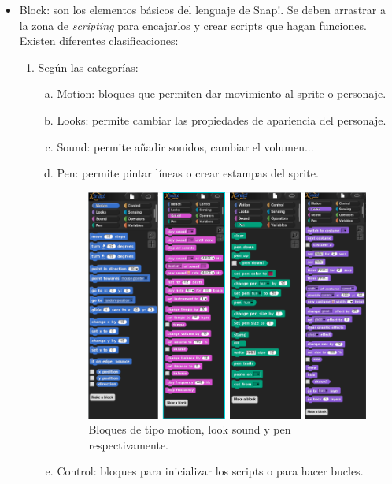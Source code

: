 \documentclass[a4paper, 12pt]{book}
\begin{document}
\begin{itemize}
     \item Block: son los elementos básicos del lenguaje de Snap!. Se deben arrastrar a la zona de \textit{scripting} para encajarlos y crear scripts que hagan funciones. Existen diferentes clasificaciones:
     
     \begin{enumerate}[1)]
        \item Según las categorías:
   
            \begin{enumerate}[a)]
                \item Motion: bloques que permiten dar movimiento al sprite o personaje.
                \item Looks: permite cambiar las propiedades de apariencia del personaje.
                \item Sound: permite añadir sonidos, cambiar el volumen...
                \item Pen: permite pintar líneas o crear estampas del sprite.
                \\
                    \begin{figure}[h]
                        \centering
                        \includegraphics[scale=0.45]{img/4-blocks.png}
                        \caption{Bloques de tipo motion, look sound y pen respectivamente.}
                        \label{figura:bloque1}
                    \end{figure}
                \item Control: bloques para inicializar los scripts o para hacer bucles.

\end{enumerate}
\end{enumerate}
\end{itemize}
\end{document}
